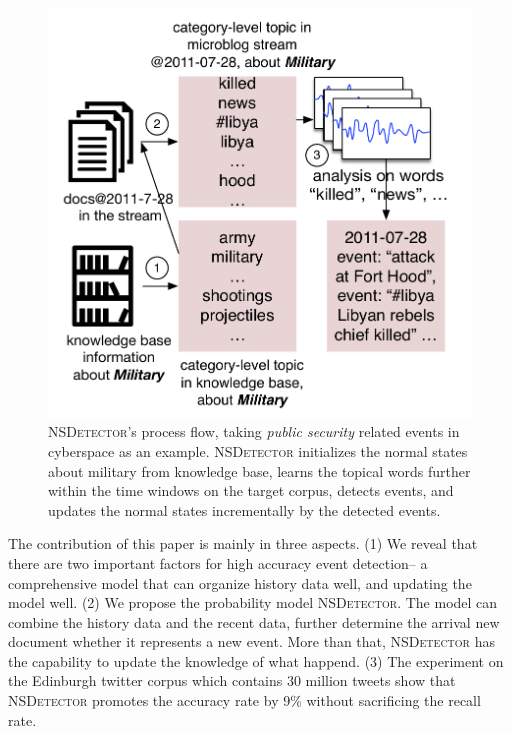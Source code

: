\documentclass[conference,compsoc]{IEEEtran}
\begin{document}
\begin{figure}[h]
    \includegraphics[width=1.0\columnwidth]{img/NSDetectorExample.pdf}
    \caption{\textsc{NSDetector}'s process flow, taking \textit{public security} related events in cyberspace as an example. \textsc{NSDetector} initializes the normal states about military from knowledge base, learns the topical words further within the time windows on the target corpus, detects events, and updates the normal states incrementally by the detected events.}
    \label{fig:modelDesc}
\end{figure}


The contribution of this paper is mainly in three aspects.
(1) We reveal that there are two important factors for high accuracy event detection-- a comprehensive model that can organize history data well, and updating the model well.
(2) We propose the probability model \textsc{NSDetector}. 
The model can combine the history data and the recent data, further determine the arrival new document whether it represents a new event. 
More than that, \textsc{NSDetector} has the capability to update the knowledge of what happend.
(3) The experiment on the Edinburgh twitter corpus which contains 30 million tweets show that \textsc{NSDetector} promotes the accuracy rate by 9\% without sacrificing the recall rate.
\end{document}
